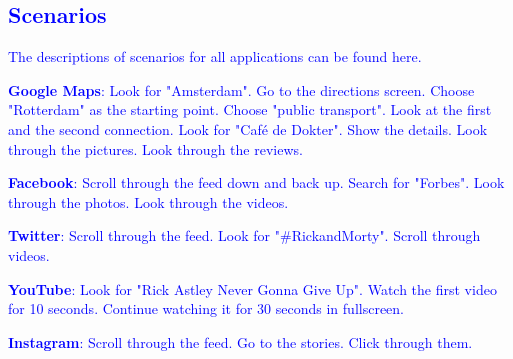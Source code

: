 
\subsection{\textcolor{blue}{Scenarios}}
\textcolor{blue}{
The descriptions of scenarios for all applications can be found here.}


\textcolor{blue}{\textbf{Google Maps}: Look for "Amsterdam". Go to the directions screen. Choose "Rotterdam" as the starting point. Choose "public transport". Look at the first and the second connection. Look for "Café de Dokter". Show the details. Look through the pictures. Look through the reviews.}

\textcolor{blue}{\textbf{Facebook}: Scroll through the feed down and back up. Search for "Forbes". Look through the photos. Look through the videos.}

\textcolor{blue}{\textbf{Twitter}: Scroll through the feed. Look for "\#RickandMorty". Scroll through videos.}

\textcolor{blue}{\textbf{YouTube}: Look for "Rick Astley Never Gonna Give Up". Watch the first video for 10 seconds. Continue watching it for 30 seconds in fullscreen.}

\textcolor{blue}{\textbf{Instagram}: Scroll through the feed. Go to the stories. Click through them.}